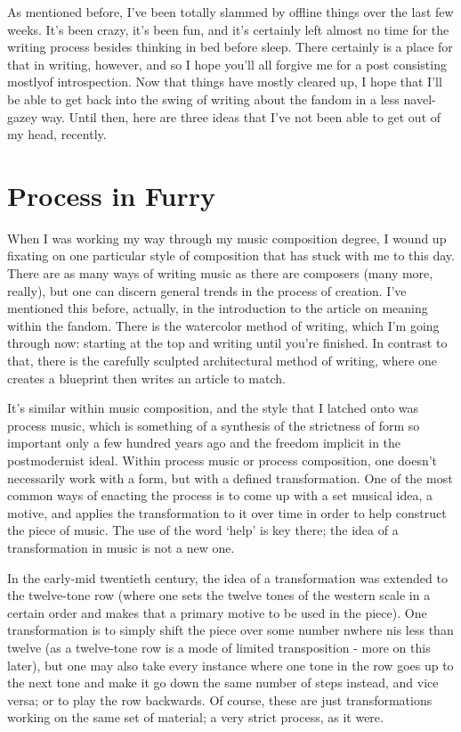 
As mentioned before, I've been totally slammed by offline things over the last few weeks. It's been crazy, it's been fun, and it's certainly left almost no time for the writing process besides thinking in bed before sleep. There certainly is a place for that in writing, however, and so I hope you'll all forgive me for a post consisting mostlyof introspection. Now that things have mostly cleared up, I hope that I'll be able to get back into the swing of writing about the fandom in a less navel-gazey way. Until then, here are three ideas that I've not been able to get out of my head, recently.

\section*{Process in Furry}

When I was working my way through my music composition degree, I wound up fixating on one particular style of composition that has stuck with me to this day. There are as many ways of writing music as there are composers (many more, really), but one can discern general trends in the process of creation. I've mentioned this before, actually, in the introduction to the article on meaning within the fandom. There is the watercolor method of writing, which I'm going through now: starting at the top and writing until you're finished. In contrast to that, there is the carefully sculpted architectural method of writing, where one creates a blueprint then writes an article to match.

It's similar within music composition, and the style that I latched onto was process music, which is something of a synthesis of the strictness of form so important only a few hundred years ago and the freedom implicit in the postmodernist ideal. Within process music or process composition, one doesn't necessarily work with a form, but with a defined transformation. One of the most common ways of enacting the process is to come up with a set musical idea, a motive, and applies the transformation to it over time in order to help construct the piece of music. The use of the word `help' is key there; the idea of a transformation in music is not a new one.

In the early-mid twentieth century, the idea of a transformation was extended to the twelve-tone row (where one sets the twelve tones of the western scale in a certain order and makes that a primary motive to be used in the piece). One transformation is to simply shift the piece over some number nwhere nis less than twelve (as a twelve-tone row is a mode of limited transposition - more on this later), but one may also take every instance where one tone in the row goes up to the next tone and make it go down the same number of steps instead, and vice versa; or to play the row backwards. Of course, these are just transformations working on the same set of material; a very strict process, as it were.

